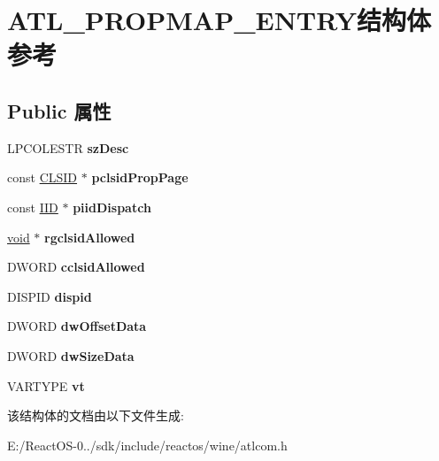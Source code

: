 \hypertarget{struct_a_t_l___p_r_o_p_m_a_p___e_n_t_r_y}{}\section{A\+T\+L\+\_\+\+P\+R\+O\+P\+M\+A\+P\+\_\+\+E\+N\+T\+R\+Y结构体 参考}
\label{struct_a_t_l___p_r_o_p_m_a_p___e_n_t_r_y}
\subsection*{Public 属性}
\begin{DoxyCompactItemize}
\item 
\mbox{\label{struct_a_t_l___p_r_o_p_m_a_p___e_n_t_r_y_a25652c8b2a7917c7785a74b18383ec4c}} 
L\+P\+C\+O\+L\+E\+S\+TR {\bfseries sz\+Desc}
\item 
\mbox{\label{struct_a_t_l___p_r_o_p_m_a_p___e_n_t_r_y_a90a52e4b7561e7c816bcc075f5c17973}} 
const \hyperlink{struct___i_i_d}{C\+L\+S\+ID} $\ast$ {\bfseries pclsid\+Prop\+Page}
\item 
\mbox{\label{struct_a_t_l___p_r_o_p_m_a_p___e_n_t_r_y_a595a63edba1e8e3a1391be6314135ae7}} 
const \hyperlink{struct___i_i_d}{I\+ID} $\ast$ {\bfseries piid\+Dispatch}
\item 
\mbox{\label{struct_a_t_l___p_r_o_p_m_a_p___e_n_t_r_y_afe705ffa7817b80964f8584666f2a820}} 
\hyperlink{interfacevoid}{void} $\ast$ {\bfseries rgclsid\+Allowed}
\item 
\mbox{\label{struct_a_t_l___p_r_o_p_m_a_p___e_n_t_r_y_a175d5c33a4273826f751a23c777b3966}} 
D\+W\+O\+RD {\bfseries cclsid\+Allowed}
\item 
\mbox{\label{struct_a_t_l___p_r_o_p_m_a_p___e_n_t_r_y_a0dd1d65cabce063f2085e631bc3ef8a2}} 
D\+I\+S\+P\+ID {\bfseries dispid}
\item 
\mbox{\label{struct_a_t_l___p_r_o_p_m_a_p___e_n_t_r_y_a0359e2ba4c23024b664e96a22e94caff}} 
D\+W\+O\+RD {\bfseries dw\+Offset\+Data}
\item 
\mbox{\label{struct_a_t_l___p_r_o_p_m_a_p___e_n_t_r_y_ac5d64d3990bf1a09c40141d814e8f395}} 
D\+W\+O\+RD {\bfseries dw\+Size\+Data}
\item 
\mbox{\label{struct_a_t_l___p_r_o_p_m_a_p___e_n_t_r_y_a9221b4d994df17fd5ea95ed2022e78bf}} 
V\+A\+R\+T\+Y\+PE {\bfseries vt}
\end{DoxyCompactItemize}


该结构体的文档由以下文件生成\+:\begin{DoxyCompactItemize}
\item 
E\+:/\+React\+O\+S-\/0../sdk/include/reactos/wine/atlcom.\+h\end{DoxyCompactItemize}
